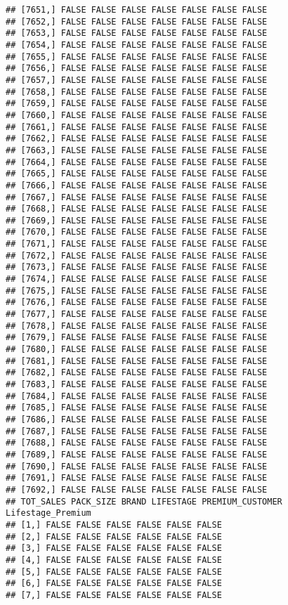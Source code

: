 \documentclass[
]{article}
\begin{document}
\begin{verbatim}
## [7651,] FALSE FALSE FALSE FALSE FALSE FALSE FALSE
## [7652,] FALSE FALSE FALSE FALSE FALSE FALSE FALSE
## [7653,] FALSE FALSE FALSE FALSE FALSE FALSE FALSE
## [7654,] FALSE FALSE FALSE FALSE FALSE FALSE FALSE
## [7655,] FALSE FALSE FALSE FALSE FALSE FALSE FALSE
## [7656,] FALSE FALSE FALSE FALSE FALSE FALSE FALSE
## [7657,] FALSE FALSE FALSE FALSE FALSE FALSE FALSE
## [7658,] FALSE FALSE FALSE FALSE FALSE FALSE FALSE
## [7659,] FALSE FALSE FALSE FALSE FALSE FALSE FALSE
## [7660,] FALSE FALSE FALSE FALSE FALSE FALSE FALSE
## [7661,] FALSE FALSE FALSE FALSE FALSE FALSE FALSE
## [7662,] FALSE FALSE FALSE FALSE FALSE FALSE FALSE
## [7663,] FALSE FALSE FALSE FALSE FALSE FALSE FALSE
## [7664,] FALSE FALSE FALSE FALSE FALSE FALSE FALSE
## [7665,] FALSE FALSE FALSE FALSE FALSE FALSE FALSE
## [7666,] FALSE FALSE FALSE FALSE FALSE FALSE FALSE
## [7667,] FALSE FALSE FALSE FALSE FALSE FALSE FALSE
## [7668,] FALSE FALSE FALSE FALSE FALSE FALSE FALSE
## [7669,] FALSE FALSE FALSE FALSE FALSE FALSE FALSE
## [7670,] FALSE FALSE FALSE FALSE FALSE FALSE FALSE
## [7671,] FALSE FALSE FALSE FALSE FALSE FALSE FALSE
## [7672,] FALSE FALSE FALSE FALSE FALSE FALSE FALSE
## [7673,] FALSE FALSE FALSE FALSE FALSE FALSE FALSE
## [7674,] FALSE FALSE FALSE FALSE FALSE FALSE FALSE
## [7675,] FALSE FALSE FALSE FALSE FALSE FALSE FALSE
## [7676,] FALSE FALSE FALSE FALSE FALSE FALSE FALSE
## [7677,] FALSE FALSE FALSE FALSE FALSE FALSE FALSE
## [7678,] FALSE FALSE FALSE FALSE FALSE FALSE FALSE
## [7679,] FALSE FALSE FALSE FALSE FALSE FALSE FALSE
## [7680,] FALSE FALSE FALSE FALSE FALSE FALSE FALSE
## [7681,] FALSE FALSE FALSE FALSE FALSE FALSE FALSE
## [7682,] FALSE FALSE FALSE FALSE FALSE FALSE FALSE
## [7683,] FALSE FALSE FALSE FALSE FALSE FALSE FALSE
## [7684,] FALSE FALSE FALSE FALSE FALSE FALSE FALSE
## [7685,] FALSE FALSE FALSE FALSE FALSE FALSE FALSE
## [7686,] FALSE FALSE FALSE FALSE FALSE FALSE FALSE
## [7687,] FALSE FALSE FALSE FALSE FALSE FALSE FALSE
## [7688,] FALSE FALSE FALSE FALSE FALSE FALSE FALSE
## [7689,] FALSE FALSE FALSE FALSE FALSE FALSE FALSE
## [7690,] FALSE FALSE FALSE FALSE FALSE FALSE FALSE
## [7691,] FALSE FALSE FALSE FALSE FALSE FALSE FALSE
## [7692,] FALSE FALSE FALSE FALSE FALSE FALSE FALSE
## TOT_SALES PACK_SIZE BRAND LIFESTAGE PREMIUM_CUSTOMER Lifestage_Premium
## [1,] FALSE FALSE FALSE FALSE FALSE FALSE
## [2,] FALSE FALSE FALSE FALSE FALSE FALSE
## [3,] FALSE FALSE FALSE FALSE FALSE FALSE
## [4,] FALSE FALSE FALSE FALSE FALSE FALSE
## [5,] FALSE FALSE FALSE FALSE FALSE FALSE
## [6,] FALSE FALSE FALSE FALSE FALSE FALSE
## [7,] FALSE FALSE FALSE FALSE FALSE FALSE

\end{verbatim}
\end{document}

